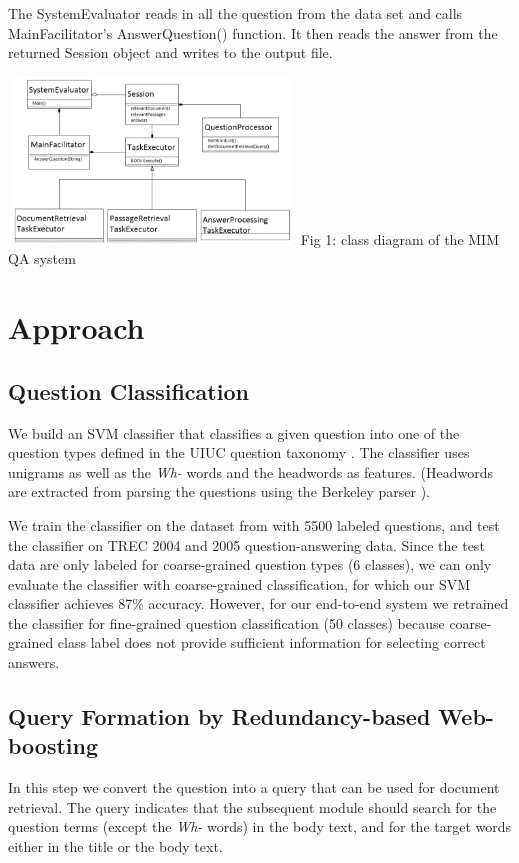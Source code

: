 \documentclass[11pt]{article}
\begin{document}
The SystemEvaluator reads in all the question from the data set and calls MainFacilitator's AnswerQuestion() function. It then reads the answer from the returned Session object and
writes to the output file.

\includegraphics[width=3in,height=1.75in]{MIM_class_diagram.png}
Fig 1: class diagram of the MIM QA system


\section{Approach}
\subsection{Question Classification}
We build an SVM classifier that classifies a given question into one of the question types defined in the UIUC question taxonomy \cite{uiuc}. The classifier uses unigrams as well as the {\it Wh-} words and the headwords as features. (Headwords are extracted from parsing the questions using the Berkeley parser \cite{berkeleyparser}).

We train the classifier on the dataset from \cite{uiuc} with 5500 labeled questions, and test the classifier on TREC 2004 and 2005 question-answering data. Since the test data are only labeled for coarse-grained question types (6 classes), we can only evaluate the classifier with coarse-grained classification, for which our SVM classifier achieves 87\% accuracy. However, for our end-to-end system we retrained the classifier for fine-grained question classification (50 classes) because coarse-grained class label does not provide sufficient information for selecting correct answers.

\subsection{Query Formation by Redundancy-based Web-boosting}
In this step we convert the question into a query that can be used for document retrieval. The query indicates that the subsequent module should search for the question terms (except the {\it Wh-} words) in the body text, and for the target words either in the title or the body text.
\end{document}
